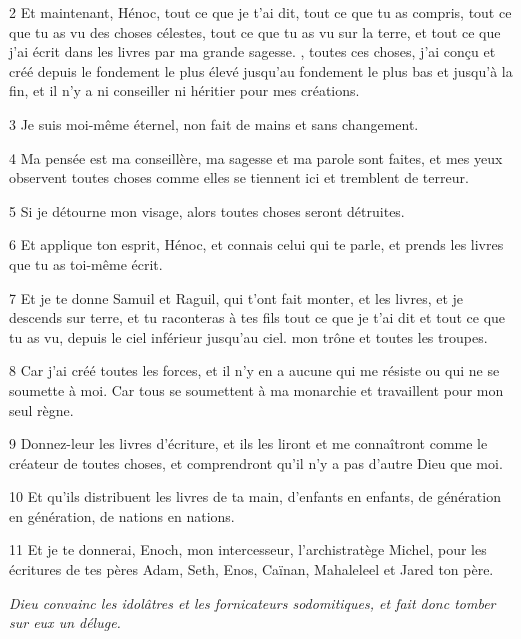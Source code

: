 \par 2 Et maintenant, Hénoc, tout ce que je t'ai dit, tout ce que tu as compris, tout ce que tu as vu des choses célestes, tout ce que tu as vu sur la terre, et tout ce que j'ai écrit dans les livres par ma grande sagesse. , toutes ces choses, j'ai conçu et créé depuis le fondement le plus élevé jusqu'au fondement le plus bas et jusqu'à la fin, et il n'y a ni conseiller ni héritier pour mes créations.

\par 3 Je suis moi-même éternel, non fait de mains et sans changement.

\par 4 Ma pensée est ma conseillère, ma sagesse et ma parole sont faites, et mes yeux observent toutes choses comme elles se tiennent ici et tremblent de terreur.

\par 5 Si je détourne mon visage, alors toutes choses seront détruites.

\par 6 Et applique ton esprit, Hénoc, et connais celui qui te parle, et prends les livres que tu as toi-même écrit.

\par 7 Et je te donne Samuil et Raguil, qui t'ont fait monter, et les livres, et je descends sur terre, et tu raconteras à tes fils tout ce que je t'ai dit et tout ce que tu as vu, depuis le ciel inférieur jusqu'au ciel. mon trône et toutes les troupes.

\par 8 Car j'ai créé toutes les forces, et il n'y en a aucune qui me résiste ou qui ne se soumette à moi. Car tous se soumettent à ma monarchie et travaillent pour mon seul règne.

\par 9 Donnez-leur les livres d'écriture, et ils les liront et me connaîtront comme le créateur de toutes choses, et comprendront qu'il n'y a pas d'autre Dieu que moi.

\par 10 Et qu'ils distribuent les livres de ta main, d'enfants en enfants, de génération en génération, de nations en nations.

\par 11 Et je te donnerai, Enoch, mon intercesseur, l'archistratège Michel, pour les écritures de tes pères Adam, Seth, Enos, Caïnan, Mahaleleel et Jared ton père.


\par \textit{Dieu convainc les idolâtres et les fornicateurs sodomitiques, et fait donc tomber sur eux un déluge.}

